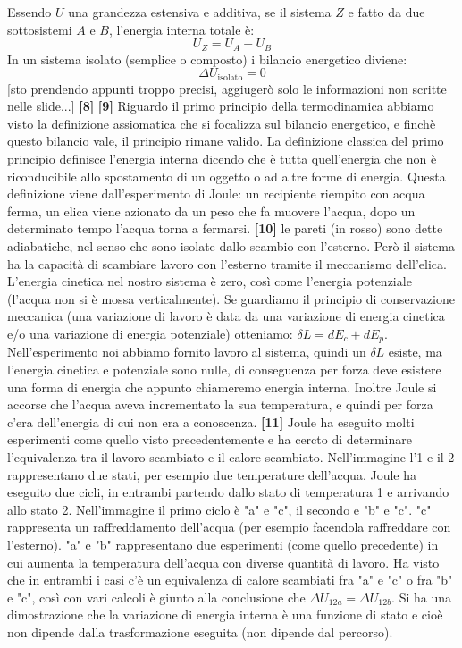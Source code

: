 Essendo $U$ una grandezza estensiva e additiva, se il sistema $Z$ e fatto da due sottosistemi $A$ e $B$, l'energia interna totale è: 
\[
    U_Z = U_A + U_B
\]
In un sistema isolato (semplice o composto) i bilancio energetico diviene:
\[
    \Delta U_{\text{isolato}} = 0
\]
[sto prendendo appunti troppo precisi, aggiugerò solo le informazioni non scritte nelle slide...]
\newline\textbf{[8]}\;
\newline\textbf{[9]}\; Riguardo il primo principio della termodinamica abbiamo visto la definizione assiomatica che si focalizza sul bilancio energetico, e finchè questo bilancio vale, il principio rimane valido. La definizione classica del primo principio definisce l'energia interna dicendo che è tutta quell'energia che non è riconducibile allo spostamento di un oggetto o ad altre forme di energia. Questa definizione viene dall'esperimento di Joule: un recipiente riempito con acqua ferma, un elica viene azionato da un peso che fa muovere l'acqua, dopo un determinato tempo l'acqua torna a fermarsi.
\newline\textbf{[10]}\; le pareti (in rosso) sono dette adiabatiche, nel senso che sono isolate dallo scambio con l'esterno. Però il sistema ha la capacità di scambiare lavoro con l'esterno tramite il meccanismo dell'elica. L'energia cinetica nel nostro sistema è zero, così come l'energia potenziale (l'acqua non si è mossa verticalmente). Se guardiamo il principio di conservazione meccanica (una variazione di lavoro è data da una variazione di energia cinetica e/o una variazione di energia potenziale) otteniamo: $\delta L = d E_c + dE_p$. Nell'esperimento noi abbiamo fornito lavoro al sistema, quindi un $\delta L$ esiste, ma l'energia cinetica e potenziale sono nulle, di conseguenza per forza deve esistere una forma di energia che appunto chiameremo energia interna. Inoltre Joule si accorse che l'acqua aveva incrementato la sua temperatura, e quindi per forza c'era dell'energia di cui non era a conoscenza.
\newline\textbf{[11]}\; Joule ha eseguito molti esperimenti come quello visto precedentemente e ha cercto di determinare l'equivalenza tra il lavoro scambiato e il calore scambiato. Nell'immagine l'1 e il 2 rappresentano due stati, per esempio due temperature dell'acqua. Joule ha eseguito due cicli, in entrambi partendo dallo stato di temperatura 1 e arrivando allo stato 2. Nell'immagine il primo ciclo è "a" e "c", il secondo e "b" e "c". "c" rappresenta un raffreddamento dell'acqua (per esempio facendola raffreddare con l'esterno). "a" e "b" rappresentano due esperimenti (come quello precedente) in cui aumenta la temperatura dell'acqua con diverse quantità di lavoro. Ha visto che in entrambi i casi c'è un equivalenza di calore scambiati fra "a" e "c" o fra "b" e "c", così con vari calcoli è giunto alla conclusione che $\Delta U_{12a} = \Delta U_{12b}$. Si ha una dimostrazione che la variazione di energia interna è una funzione di stato e cioè non dipende dalla trasformazione eseguita (non dipende dal percorso).
